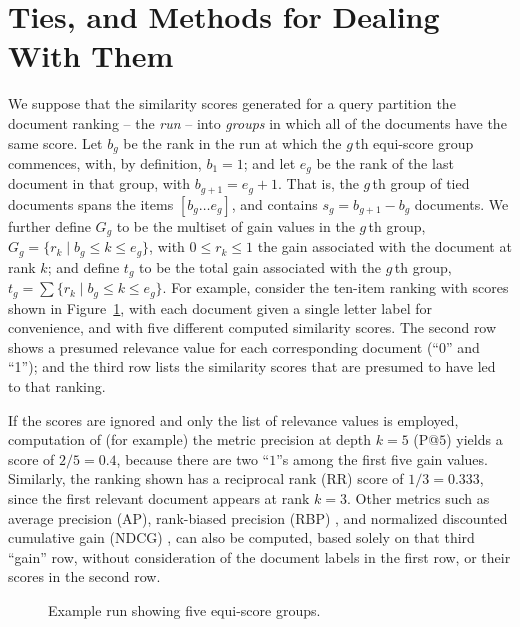 \section{Ties, and Methods for Dealing With Them}
\label{sec-ties}


We suppose that the similarity scores generated for a query partition
the document ranking -- the {\emph{run}} -- into {\emph{groups}} in
which all of the documents have the same score.
Let $b_g$ be the rank in the run at which the $g$\,th equi-score
group commences, with, by definition, $b_1=1$; and let $e_g$ be the
rank of the last document in that group, with $b_{g+1}=e_g+1$.
That is, the $g$\,th group of tied documents spans the items
$[b_g\ldots e_g]$, and contains $s_g=b_{g+1}-b_g$ documents.
We further define $G_g$ to be the
multiset of gain values in the $g$\,th group,
	$G_g =\{r_k\mid b_g \le k \le e_g\}$, 
with $0\le r_k \le 1$ the gain associated with the document at rank $k$;
and define $t_g$
to be the total gain associated with the $g$\,th group,
	$t_g = \sum \{r_k\mid b_g \le k \le e_g\}$.
For example, consider the ten-item ranking with scores shown in
Figure~\ref{fig-example}, with each document given a single letter
label for convenience, and with five different computed similarity
scores.
The second row shows a presumed relevance value for each
corresponding document (``$0$'' and ``1''); and the third row lists
the similarity scores that are presumed to have led to that ranking.

If the scores are ignored and only the list of relevance values is
employed, computation of (for example) the metric precision at depth
$k=5$ (P@$5$) yields a score of $2/5=0.4$, because there are two
``$1$''s among the first five gain values.
Similarly, the ranking shown has a reciprocal rank (RR) score of
$1/3=0.333$, since the first relevant document appears at rank $k=3$.
Other metrics such as average precision (AP), rank-biased precision
(RBP) {\citep{mz08acmtois}}, and normalized discounted cumulative
gain (NDCG) {\citep{jk02acmtois}}, can also be computed, based solely
on that third ``gain'' row, without consideration of the document
labels in the first row, or their scores in the second row.

\begin{figure}[t]
\centering

\caption{Example run showing five equi-score groups.
\label{fig-example}}
\end{figure}

